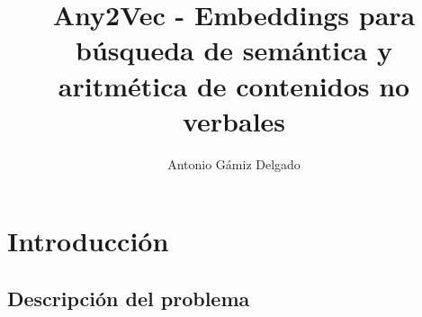 \documentclass{beamer}
\title[Any2Vec - Embeddings para búsqueda de semántica y aritmética de contenidos no verbales]{Any2Vec - Embeddings para búsqueda de semántica y aritmética de contenidos no verbales}
\author[A. Gámiz]{Antonio Gámiz Delgado}
\begin{document}
	\typesetFrontSlides


\section{Introducción}

\subsection[Problema]{Descripción del problema}
\end{document}
